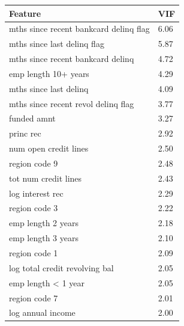 \begin{tabular}{ll}
\toprule
Feature & VIF \\
\midrule
mths since recent bankcard delinq flag & 6.06 \\
mths since last delinq flag & 5.87 \\
mths since recent bankcard delinq & 4.72 \\
emp length 10+ years & 4.29 \\
mths since last delinq & 4.09 \\
mths since recent revol delinq flag & 3.77 \\
funded amnt & 3.27 \\
princ rec & 2.92 \\
num open credit lines & 2.50 \\
region code 9 & 2.48 \\
tot num credit lines & 2.43 \\
log interest rec & 2.29 \\
region code 3 & 2.22 \\
emp length 2 years & 2.18 \\
emp length 3 years & 2.10 \\
region code 1 & 2.09 \\
log total credit revolving bal & 2.05 \\
emp length < 1 year & 2.05 \\
region code 7 & 2.01 \\
log annual income & 2.00 \\
\bottomrule
\end{tabular}
